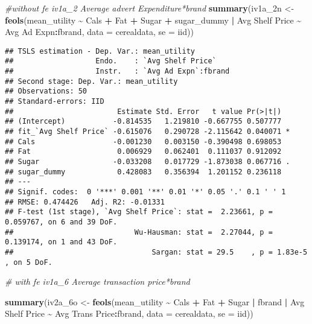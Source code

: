 \documentclass[
]{article}
\newenvironment{Shaded}{\begin{snugshade}}{\end{snugshade}}
\newcommand{\AttributeTok}[1]{\textcolor[rgb]{0.13,0.29,0.53}{#1}}
\newcommand{\CommentTok}[1]{\textcolor[rgb]{0.56,0.35,0.01}{\textit{#1}}}
\newcommand{\FunctionTok}[1]{\textcolor[rgb]{0.13,0.29,0.53}{\textbf{#1}}}
\newcommand{\NormalTok}[1]{#1}
\newcommand{\OtherTok}[1]{\textcolor[rgb]{0.56,0.35,0.01}{#1}}
\newcommand{\SpecialCharTok}[1]{\textcolor[rgb]{0.81,0.36,0.00}{\textbf{#1}}}
\newcommand{\StringTok}[1]{\textcolor[rgb]{0.31,0.60,0.02}{#1}}
\begin{document}
\begin{Shaded}
\begin{Highlighting}[]
\CommentTok{\#without fe  iv1a\_2 Average advert Expenditure*brand }
\FunctionTok{summary}\NormalTok{(iv1a\_2n }\OtherTok{\textless{}{-}} \FunctionTok{feols}\NormalTok{(mean\_utility }\SpecialCharTok{\textasciitilde{}}\NormalTok{ Cals }\SpecialCharTok{+}\NormalTok{ Fat }\SpecialCharTok{+}\NormalTok{ Sugar }\SpecialCharTok{+}\NormalTok{ sugar\_dummy }\SpecialCharTok{|} \StringTok{\textasciigrave{}}\AttributeTok{Avg Shelf Price}\StringTok{\textasciigrave{}} \SpecialCharTok{\textasciitilde{}} \StringTok{\textasciigrave{}}\AttributeTok{Avg Ad Expn}\StringTok{\textasciigrave{}}\SpecialCharTok{:}\NormalTok{fbrand, }\AttributeTok{data =}\NormalTok{ cerealdata, }\AttributeTok{se =} \StringTok{\textquotesingle{}iid\textquotesingle{}}\NormalTok{))}
\end{Highlighting}
\end{Shaded}

\begin{verbatim}
## TSLS estimation - Dep. Var.: mean_utility
##                   Endo.    : `Avg Shelf Price`
##                   Instr.   : `Avg Ad Expn`:fbrand
## Second stage: Dep. Var.: mean_utility
## Observations: 50
## Standard-errors: IID 
##                        Estimate Std. Error   t value Pr(>|t|)    
## (Intercept)           -0.814535   1.219810 -0.667755 0.507777    
## fit_`Avg Shelf Price` -0.615076   0.290728 -2.115642 0.040071 *  
## Cals                  -0.001230   0.003150 -0.390498 0.698053    
## Fat                    0.006929   0.062401  0.111037 0.912092    
## Sugar                 -0.033208   0.017729 -1.873038 0.067716 .  
## sugar_dummy            0.428083   0.356394  1.201152 0.236118    
## ---
## Signif. codes:  0 '***' 0.001 '**' 0.01 '*' 0.05 '.' 0.1 ' ' 1
## RMSE: 0.474426   Adj. R2: -0.01331
## F-test (1st stage), `Avg Shelf Price`: stat =  2.23661, p = 0.059767, on 6 and 39 DoF.
##                            Wu-Hausman: stat =  2.27044, p = 0.139174, on 1 and 43 DoF.
##                                Sargan: stat = 29.5    , p = 1.83e-5 , on 5 DoF.
\end{verbatim}

\begin{Shaded}
\begin{Highlighting}[]
\CommentTok{\# with fe  iv1a\_6 Average transaction price*brand }

\FunctionTok{summary}\NormalTok{(iv2a\_6o }\OtherTok{\textless{}{-}} \FunctionTok{feols}\NormalTok{(mean\_utility }\SpecialCharTok{\textasciitilde{}}\NormalTok{ Cals }\SpecialCharTok{+}\NormalTok{ Fat }\SpecialCharTok{+}\NormalTok{ Sugar }\SpecialCharTok{|}\NormalTok{ fbrand }\SpecialCharTok{|} \StringTok{\textasciigrave{}}\AttributeTok{Avg Shelf Price}\StringTok{\textasciigrave{}} \SpecialCharTok{\textasciitilde{}} \StringTok{\textasciigrave{}}\AttributeTok{Avg Trans Price}\StringTok{\textasciigrave{}}\SpecialCharTok{:}\NormalTok{fbrand, }
                        \AttributeTok{data =}\NormalTok{ cerealdata, }\AttributeTok{se =} \StringTok{\textquotesingle{}iid\textquotesingle{}}\NormalTok{))}
\end{Highlighting}
\end{Shaded}
\end{document}
